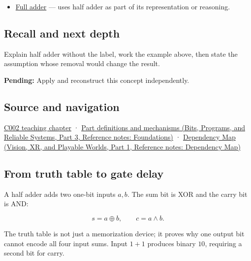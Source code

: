 \hypertarget{appendix-1652d27a8e90-used-by}{}

\begin{itemize}
\tightlist
\item
  \hyperref[appendix-d1a5b1e520c2]{Full adder} --- uses half adder as part of its representation or reasoning.
\end{itemize}

\subsection{Recall and next depth}\label{appendix-1652d27a8e90-recall-and-next-depth}

\hypertarget{appendix-1652d27a8e90-recall-and-next-depth}{}

Explain half adder without the label, work the example above, then state the assumption whose removal would change the result.

\textbf{Pending:} Apply and reconstruct this concept independently.

\subsection{Source and navigation}\label{appendix-1652d27a8e90-source-and-navigation}

\hypertarget{appendix-1652d27a8e90-source-and-navigation}{}

\hyperref[01-foundations-i-ch001-arithmetic-becomes-a-policy]{C002 teaching chapter} · \href{../01-Bits-Programs-and-Reliable-Systems-P03/main.pdf\#appendix-fd090d982a15}{Part definitions and mechanisms (Bits, Programs, and Reliable Systems, Part 3, Reference notes: Foundations)} · \href{../07-Vision-XR-and-Playable-Worlds-P01/main.pdf\#appendix-4ad47bdd269a}{Dependency Map (Vision, XR, and Playable Worlds, Part 1, Reference notes: Dependency Map)}

\subsection{From truth table to gate delay}\label{appendix-1652d27a8e90-from-truth-table-to-gate-delay}

\hypertarget{appendix-1652d27a8e90-from-truth-table-to-gate-delay}{}

A half adder adds two one-bit inputs \(a,b\). The sum bit is XOR and the carry bit is AND:

\[
s=a\oplus b,\qquad c=a\land b.
\]

The truth table is not just a memorization device; it proves why one output bit cannot encode all four input sums. Input \(1+1\) produces binary \(10\), requiring a second bit for carry.

